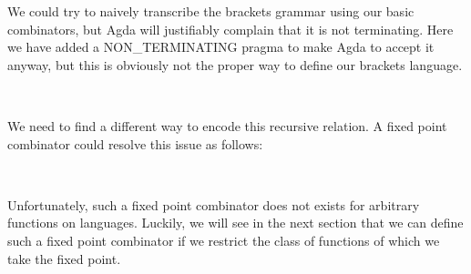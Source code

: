 We could try to naively transcribe the brackets grammar using our basic combinators, but Agda will justifiably complain that it is not terminating. Here we have added a NON_TERMINATING pragma to make Agda to accept it anyway, but this is obviously not the proper way to define our brackets language.
%
\begin{code}%
%
\>[4]\AgdaSymbol{\{-\#}\AgdaSpace{}%
\AgdaSpace{}%
\AgdaSymbol{\#-\}}\<%
\\
%
\>[4]\AgdaSpace{}%
\AgdaSymbol{=}\AgdaSpace{}%
\AgdaSpace{}%
\AgdaSpace{}%
\AgdaSpace{}%
\AgdaString{'['}\AgdaSpace{}%
\AgdaSpace{}%
\AgdaSpace{}%
\AgdaSpace{}%
\AgdaSpace{}%
\AgdaString{']'}\AgdaSpace{}%
\AgdaSpace{}%
\AgdaSpace{}%
\AgdaSpace{}%
\<%
\end{code}
%
We need to find a different way to encode this recursive relation.
A fixed point combinator could resolve this issue as follows:
\begin{code}%
%
\>[4]\AgdaSpace{}%
\AgdaSpace{}%
\AgdaSymbol{:}\AgdaSpace{}%
\AgdaSymbol{(}\AgdaSpace{}%
\AgdaSpace{}%
\AgdaSymbol{)}\AgdaSpace{}%
\AgdaSpace{}%
\<%
\\
%
\>[4]\AgdaSpace{}%
\AgdaSymbol{=}\AgdaSpace{}%
\AgdaSpace{}%
\AgdaSpace{}%
\AgdaSpace{}%
\AgdaSpace{}%
\AgdaSpace{}%
\AgdaSpace{}%
\AgdaSpace{}%
\AgdaString{'['}\AgdaSpace{}%
\AgdaSpace{}%
\AgdaSpace{}%
\AgdaSpace{}%
\AgdaSpace{}%
\AgdaString{']'}\AgdaSpace{}%
\AgdaSpace{}%
\AgdaSpace{}%
\AgdaSpace{}%
\AgdaSymbol{)}\<%
\end{code}

Unfortunately, such a fixed point combinator does not exists for arbitrary
functions on languages. Luckily, we will see in the next section that we can
define such a fixed point combinator if we restrict the class of functions of which we take the fixed point.


